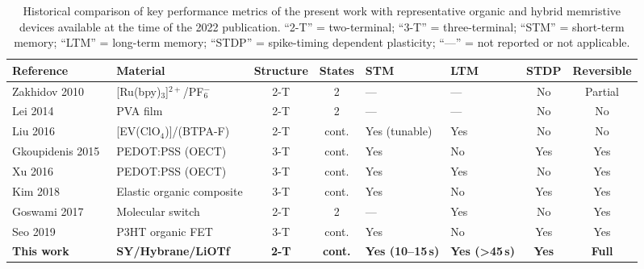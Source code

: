 \begin{table}
  \centering
  \caption[Historical comparison with organic and hybrid memristive devices]{Historical comparison of key performance metrics of the present work with representative organic and hybrid memristive devices available at the time of the 2022 publication. ``2-T'' = two-terminal; ``3-T'' = three-terminal; ``STM'' = short-term memory; ``LTM'' = long-term memory; ``STDP'' = spike-timing dependent plasticity; ``---'' = not reported or not applicable.}\label{tab:ch2_historical_comparison}
  \footnotesize
  \setlength{\tabcolsep}{3pt}
  \begin{tabular}{llccllcc}
    \toprule
    \textbf{Reference} & \textbf{Material} & \textbf{Structure} & \textbf{States} & \textbf{STM} & \textbf{LTM} & \textbf{STDP} & \textbf{Reversible} \\
    \midrule
    Zakhidov 2010~\cite{Zakhidov2010}      & [Ru(bpy)$_3$]$^{2+}$/PF$_6^-$ & 2-T & 2    & ---           & ---        & No  & Partial \\
    Lei 2014~\cite{Lei2014}                & PVA film                  & 2-T & 2    & ---           & ---        & No  & No      \\
    Liu 2016~\cite{Liu2016}                & [EV(ClO$_4$)]/(BTPA-F)   & 2-T & cont.& Yes (tunable) & Yes        & No  & No      \\
    Gkoupidenis 2015~\cite{Gkoupidenis2015}& PEDOT:PSS (OECT)          & 3-T & cont.& Yes           & No         & Yes & Yes     \\
    Xu 2016~\cite{Xu2016}                  & PEDOT:PSS (OECT)          & 3-T & cont.& Yes           & Yes        & No  & Yes     \\
    Kim 2018~\cite{Kim2018}                & Elastic organic composite & 3-T & cont.& Yes           & No         & Yes & Yes     \\
    Goswami 2017~\cite{Goswami2017}        & Molecular switch          & 2-T & 2    & ---           & Yes        & No  & Yes     \\
    Seo 2019~\cite{Seo2019}                & P3HT organic FET          & 3-T & cont.& Yes           & No         & Yes & Yes     \\
    \midrule
    \textbf{This work}~\cite{PradoSocorro2022} & \textbf{SY/Hybrane/LiOTf}  & \textbf{2-T} & \textbf{cont.} & \textbf{Yes (10--15\,s)} & \textbf{Yes (>45\,s)} & \textbf{Yes} & \textbf{Full} \\
    \bottomrule
  \end{tabular}
\end{table}

